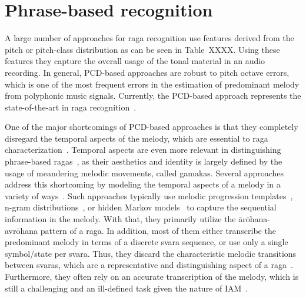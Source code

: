 %
%
\section{Phrase-based  recognition}


A large number of approaches for \gls{raga} recognition use features derived from the pitch or pitch-class distribution as can be seen in Table~XXXX. Using these features they capture the overall usage of the tonal material in an audio recording. In general, PCD-based approaches are robust to pitch octave errors, which is one of the most frequent errors in the estimation of predominant melody from polyphonic music signals. Currently, the PCD-based approach represents the state-of-the-art in \gls{raga} recognition~\citep{chordia2013joint}.

One of the major shortcomings of PCD-based approaches is that they completely disregard the temporal aspects of the melody, which are essential to \gls{raga} characterization~\cite{rao1999raga}. Temporal aspects are even more relevant in distinguishing phrase-based \glspl{raga}~\cite{krishna2012carnatic}, as their aesthetics and identity is largely defined by the usage of meandering melodic movements, called gamakas. Several approaches address this shortcoming by modeling the temporal aspects of a melody in a variety of ways~\cite{kumar2014identifying, shetty2009raga, rajkumar2011identification}. Such approaches typically use melodic progression templates~\cite{shetty2009raga}, n-gram distributions~\cite{kumar2014identifying}, or hidden Markov models~\cite{rajkumar2011identification} to capture the sequential information in the melody. With that, they primarily utilize the \={a}r\={o}hana-avr\={o}hana pattern of a \gls{raga}. In addition, most of them either transcribe the predominant melody in terms of a discrete svara sequence, or use only a single symbol/state per svara. Thus, they discard the characteristic melodic transitions between svaras, which are a representative and distinguishing aspect of a \gls{raga}~\cite{rao1999raga}. Furthermore, they often rely on an accurate transcription of the melody, which is still a challenging and an ill-defined task given the nature of IAM~\cite{rao2012culture, Suvarnalata2014}. 

